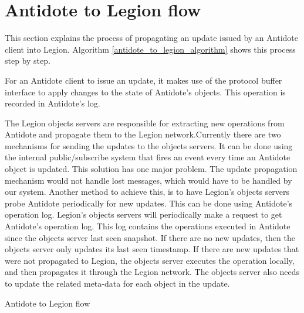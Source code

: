 \section{Antidote to Legion flow}
\label{sec:antidote_to_legion_flow}
This section explains the process of propagating an update issued by an Antidote client into Legion. Algorithm \ref{antidote_to_legion_algorithm} shows this process step by step.\par
	For an Antidote client to issue an update, it makes use of the protocol buffer interface\cite{protocol_buffers} to apply changes to the state of Antidote's objects. This operation is recorded in Antidote's log.\par
	The Legion objects servers are responsible for extracting new operations from Antidote and propagate them to the Legion network.Currently there are two mechanisms for sending the updates to the objects servers. It can be done using the internal public/subscribe system that fires an event every time an Antidote object is updated. This solution has one major problem. The update propagation mechanism would not handle lost messages, which would have to be handled by our system.
	Another method to achieve this, is to have Legion's objects servers probe Antidote periodically for new updates. This can be done using Antidote's operation log. Legion's objects servers will periodically make a request to get Antidote's operation log. This log contains the operations executed in Antidote since the objects server last seen snapshot. If there are no new updates, then the objects server only updates its last seen timestamp. If there are new updates that were not propagated to Legion, the objects server executes the operation locally, and then propagates it through the Legion network. The objects server also needs to update the related meta-data for each object in the update.
	
\begin{algorithm}
\caption{Antidote to Legion flow}
\label{antidote_to_legion_algorithm}
\begin{algorithmic}[1]
      \EndIf
    \EndFor
  \End
\end{algorithmic}
\end{algorithm}